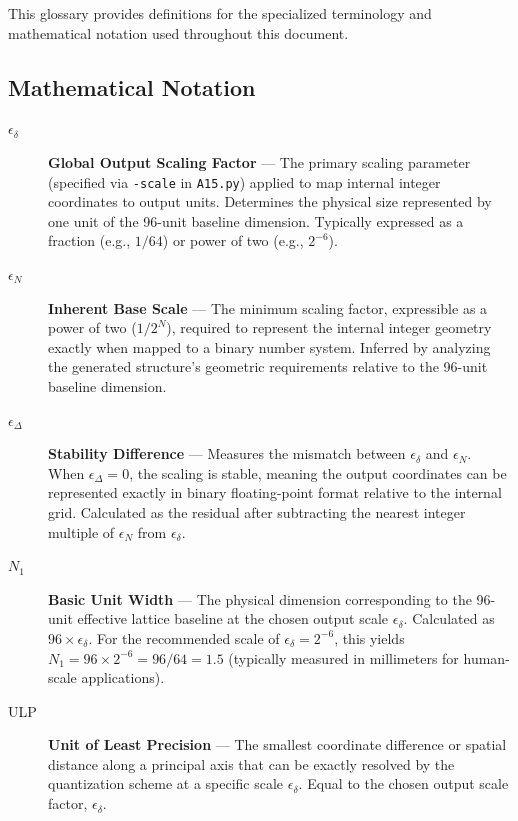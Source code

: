 \documentclass[10pt]{article}
\begin{document}
This glossary provides definitions for the specialized terminology and mathematical notation used throughout this document.

\subsection{Mathematical Notation}
\label{subsec-glossary-notation}

\begin{description}
    \item[$\epsilon_\delta$] \textbf{Global Output Scaling Factor} — The primary scaling parameter (specified via \texttt{-scale} in \texttt{A15.py}) applied to map internal integer coordinates to output units. Determines the physical size represented by one unit of the 96-unit baseline dimension. Typically expressed as a fraction (e.g., $1/64$) or power of two (e.g., $2^{-6}$).

    \item[$\epsilon_N$] \textbf{Inherent Base Scale} — The minimum scaling factor, expressible as a power of two ($1/2^N$), required to represent the internal integer geometry exactly when mapped to a binary number system. Inferred by analyzing the generated structure's geometric requirements relative to the 96-unit baseline dimension.

    \item[$\epsilon_\Delta$] \textbf{Stability Difference} — Measures the mismatch between $\epsilon_\delta$ and $\epsilon_N$. When $\epsilon_\Delta = 0$, the scaling is stable, meaning the output coordinates can be represented exactly in binary floating-point format relative to the internal grid. Calculated as the residual after subtracting the nearest integer multiple of $\epsilon_N$ from $\epsilon_\delta$.

    \item[$N_1$] \textbf{Basic Unit Width} — The physical dimension corresponding to the 96-unit effective lattice baseline at the chosen output scale $\epsilon_\delta$. Calculated as $96 \times \epsilon_\delta$. For the recommended scale of $\epsilon_\delta = 2^{-6}$, this yields $N_1 = 96 \times 2^{-6} = 96/64 = 1.5$ (typically measured in millimeters for human-scale applications).

    \item[ULP] \textbf{Unit of Least Precision} — The smallest coordinate difference or spatial distance along a principal axis that can be exactly resolved by the quantization scheme at a specific scale $\epsilon_\delta$. Equal to the chosen output scale factor, $\epsilon_\delta$.
\end{description}
\end{document}
